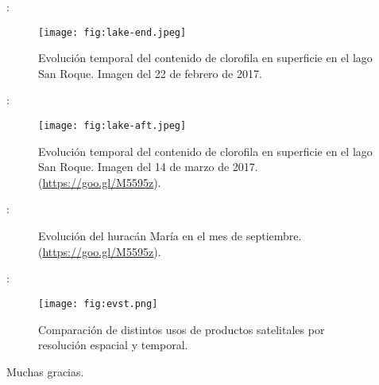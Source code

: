 \begin{frame}{\secname : \subsecname}
    \begin{figure}[h!]
        \centering
        \texttt{[image: fig:lake-end.jpeg]}
        \caption{Evolución temporal del contenido de clorofila en superficie en el lago San Roque. Imagen del 22 de febrero de 2017.}
        \label{fig:lake-end}
    \end{figure}
\end{frame}

\begin{frame}{\secname : \subsecname}
    \begin{figure}[h!]
        \centering
        \texttt{[image: fig:lake-aft.jpeg]}
        \caption{Evolución temporal del contenido de clorofila en superficie en el lago San Roque. Imagen del 14 de marzo de 2017. (\href{https://goo.gl/M5595z}{https://goo.gl/M5595z}).}
        \label{fig:lake-aft}
    \end{figure}
\end{frame}

\begin{frame}{\secname : \subsecname}
    \begin{figure}[h!]
    \centering
    \caption{Evolución del huracán María en el mes de septiembre. (\href{https://goo.gl/M5595z}{https://goo.gl/M5595z}).}
    \end{figure}
\end{frame}

\begin{frame}{\secname : \subsecname}
    \begin{figure}[h!]
        \centering
        \texttt{[image: fig:evst.png]}
        \caption{Comparación de distintos usos de productos satelitales por resolución espacial y temporal.}
        \label{fig:evst}
    \end{figure}
\end{frame}

\begin{frame}{\secname}
Muchas gracias.
\end{frame}
